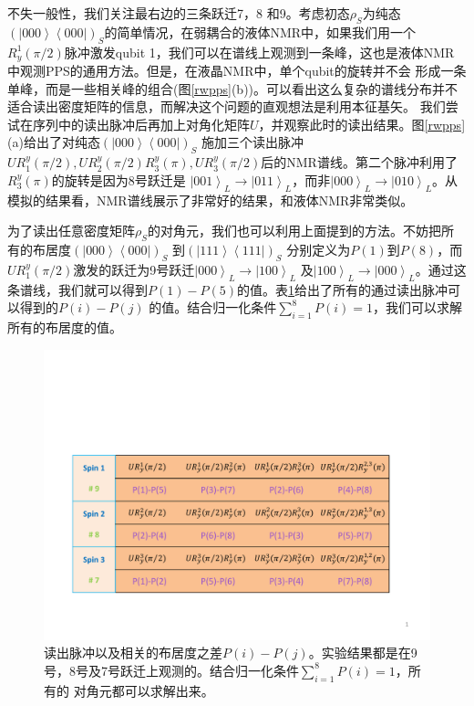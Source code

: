 不失一般性，我们关注最右边的三条跃迁7，8 和9。考虑初态$\rho_S$为纯态$(\left\vert 000 \right\rangle\left\langle 000
\right\vert)_S$的简单情况，在弱耦合的液体NMR中，如果我们用一个$R_y^1(\pi/2)$脉冲激发qubit 1，我们可以在谱线上观测到一条峰，这也是液体NMR中观测PPS的通用方法。但是，在液晶NMR中，单个qubit的旋转并不会
形成一条单峰，而是一些相关峰的组合(图\ref{rwpps}(b))。可以看出这么复杂的谱线分布并不适合读出密度矩阵的信息，而解决这个问题的直观想法是利用本征基矢。
我们尝试在序列中的读出脉冲后再加上对角化矩阵$U$，并观察此时的读出结果。图\ref{rwpps}(a)给出了对纯态$(\left\vert 000 \right\rangle\left\langle 000 \right\vert)_S$ 施加三个读出脉冲
$UR_1^y(\pi/2),UR_2^y(\pi/2)R_3^y(\pi),UR_3^y(\pi/2)$后的NMR谱线。第二个脉冲利用了$R_3^y(\pi)$的旋转是因为8号跃迁是
$\left\vert 001 \right\rangle_L\rightarrow \left\vert 011
\right\rangle_L$，而非$\left\vert 000 \right\rangle_L\rightarrow
\left\vert 010 \right\rangle_L$。从模拟的结果看，NMR谱线展示了非常好的结果，和液体NMR非常类似。

为了读出任意密度矩阵$\rho_S$的对角元，我们也可以利用上面提到的方法。不妨把所有的布居度$(\left\vert 000 \right\rangle\left\langle 000
\right\vert)_S$ 到$(\left\vert 111 \right\rangle\left\langle 111
\right\vert)_S$ 分别定义为$P(1)$到$P(8)$，而$UR_1^y(\pi/2)$激发的跃迁为9号跃迁$\left\vert 000 \right\rangle_L\rightarrow \left\vert
100 \right\rangle_L$ 及$\left\vert 100 \right\rangle_L\rightarrow
\left\vert 000 \right\rangle_L$。通过这条谱线，我们就可以得到$P(1)-P(5)$的值。表\ref{rwread}给出了所有的通过读出脉冲可以得到的$P(i)-P(j)$
的值。结合归一化条件$\sum_{i=1}^8P(i)=1$，我们可以求解所有的布居度的值。

\begin{figure}[htbp]
            \begin{center}
              \includegraphics[width= 0.8\columnwidth]{figures/rwread.pdf}
              \caption{读出脉冲以及相关的布居度之差$P(i)-P(j)$。实验结果都是在9号，8号及7号跃迁上观测的。结合归一化条件$\sum_{i=1}^8P(i)=1$，所有的
对角元都可以求解出来。}
              \label{rwread}
            \end{center}
 \end{figure}

